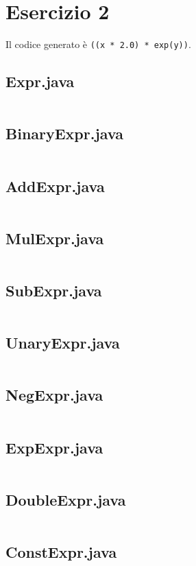 \section*{Esercizio 2}

Il codice generato è \texttt{((x * 2.0) * exp(y))}.

\subsection*{Expr.java}
\inputminted{java}{tex/src/2/Expr.java}

\subsection*{BinaryExpr.java}
\inputminted{java}{tex/src/2/BinaryExpr.java}

\subsection*{AddExpr.java}
\inputminted{java}{tex/src/2/AddExpr.java}

\subsection*{MulExpr.java}
\inputminted{java}{tex/src/2/MulExpr.java}

\subsection*{SubExpr.java}
\inputminted{java}{tex/src/2/SubExpr.java}

\subsection*{UnaryExpr.java}
\inputminted{java}{tex/src/2/UnaryExpr.java}

\subsection*{NegExpr.java}
\inputminted{java}{tex/src/2/NegExpr.java}

\subsection*{ExpExpr.java}
\inputminted{java}{tex/src/2/ExpExpr.java}

\subsection*{DoubleExpr.java}
\inputminted{java}{tex/src/2/DoubleExpr.java}

\subsection*{ConstExpr.java}
\inputminted{java}{tex/src/2/ConstExpr.java}

